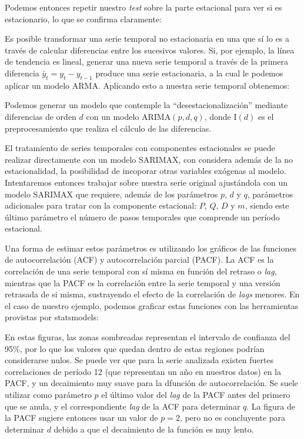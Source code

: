 Podemos entonces repetir nuestro \textit{test} sobre la parte estacional para ver si es estacionario, lo que se confirma claramente:

Es posible transformar una serie temporal no estacionaria en una que sí lo es a través de calcular diferencias entre los sucesivos valores. Si, por ejemplo, la línea de tendencia es lineal, generar una nueva serie temporal a través de la primera diferencia $\bar{y}_t = y_t - y_{t-1}$ produce una serie estacionaria, a la cual le podemos aplicar un modelo ARMA. Aplicando esto a nuestra serie temporal obtenemos:


Podemos generar un modelo que contemple la ``desestacionalización'' mediante diferencias de orden $d$ con un modelo ARIMA$(p, d, q)$, donde I$(d)$ es el preprocesamiento que realiza el cálculo de las diferencias.

El tratamiento de series temporales con componentes estacionales se puede realizar directamente con un modelo SARIMAX, con considera además de la no estacionalidad, la posibilidad de incoporar otras variables exógenas al modelo. Intentaremos entonces trabajar sobre nuestra serie original ajustándola con un modelo SARIMAX que requiere, además de los parámetros $p$, $d$ y $q$, parámetros adicionales para tratar con la componente estacional: $P$, $Q$, $D$ y $m$, siendo este último parámetro el número de pasos temporales que comprende un período estacional.

Una forma de estimar estos parámetros es utilizando los gráficos de las funciones de autocorrelación (ACF) y autocorrelación parcial (PACF). La ACF es la correlación de una serie temporal con sí misma en función del retraso o \textit{lag}, mientras que la PACF es la correlación entre la serie temporal y una versión retrasada de si misma, sustrayendo el efecto de la correlación de \textit{lags} menores. En el caso de nuestro ejemplo, podemos graficar estas funciones con las herramientas provistas por statsmodels:


En estas figuras, las zonas sombreadas representan el intervalo de confianza del 95\%, por lo que los valores que quedan dentro de estas regiones podrían considerarse nulos. Se puede ver que para la serie analizada existen fuertes correlaciones de período 12 (que representan un año en nuestros datos) en la PACF, y un decaimiento muy suave para la dfunción de autocorrelación. Se suele utilizar como parámetro $p$ el último valor del \textit{lag} de la PACF antes del primero que se anula, y el correspondiente \textit{lag} de la ACF para determinar $q$. La figura de la PACF sugiere entonces usar un valor de $p=2$, pero no es concluyente para determinar $d$ debido a que el decaimiento de la función es muy lento.

